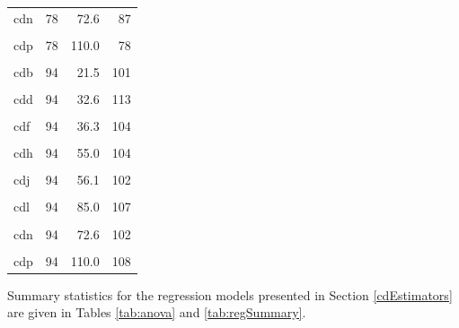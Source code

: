 \begin{longtable}[t]{lrrr}
cdn & 78 & 72.6 & 87\\
\cellcolor{gray!6}{cdo} & \cellcolor{gray!6}{78} & \cellcolor{gray!6}{88.0} & \cellcolor{gray!6}{85}\\
cdp & 78 & 110.0 & 78\\
\cellcolor{gray!6}{cda} & \cellcolor{gray!6}{94} & \cellcolor{gray!6}{13.0} & \cellcolor{gray!6}{95}\\
cdb & 94 & 21.5 & 101\\
\cellcolor{gray!6}{cdc} & \cellcolor{gray!6}{94} & \cellcolor{gray!6}{26.1} & \cellcolor{gray!6}{108}\\
cdd & 94 & 32.6 & 113\\
\cellcolor{gray!6}{cde} & \cellcolor{gray!6}{94} & \cellcolor{gray!6}{22.0} & \cellcolor{gray!6}{100}\\
cdf & 94 & 36.3 & 104\\
\cellcolor{gray!6}{cdg} & \cellcolor{gray!6}{94} & \cellcolor{gray!6}{44.0} & \cellcolor{gray!6}{104}\\
cdh & 94 & 55.0 & 104\\
\cellcolor{gray!6}{cdi} & \cellcolor{gray!6}{94} & \cellcolor{gray!6}{34.0} & \cellcolor{gray!6}{101}\\
cdj & 94 & 56.1 & 102\\
\cellcolor{gray!6}{cdk} & \cellcolor{gray!6}{94} & \cellcolor{gray!6}{68.0} & \cellcolor{gray!6}{101}\\
cdl & 94 & 85.0 & 107\\
\cellcolor{gray!6}{cdm} & \cellcolor{gray!6}{94} & \cellcolor{gray!6}{44.0} & \cellcolor{gray!6}{106}\\
cdn & 94 & 72.6 & 102\\
\cellcolor{gray!6}{cdo} & \cellcolor{gray!6}{94} & \cellcolor{gray!6}{88.0} & \cellcolor{gray!6}{98}\\
cdp & 94 & 110.0 & 108\\*
\end{longtable}

\endgroup

Summary statistics for the regression models presented in Section \ref{cdEstimators} are given in Tables \ref{tab:anova} and \ref{tab:regSummary}.

